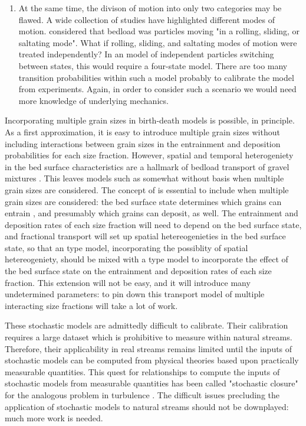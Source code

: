 \begin{enumerate}
\item At the same time, the divison of motion into only two categories may be flawed. A wide collection of studies have highlighted different modes of motion. \citet{Einstein1950} considered that bedload was particles moving "in a rolling, sliding, or saltating mode". What if rolling, sliding, and saltating modes of motion were treated independently? In an \citet{Ancey2006} model of independent particles switching between states, this would require a four-state model. There are too many transition probabilities within such a model probably to calibrate the model from experiments. Again, in order to consider such a scenario we would need more knowledge of underlying mechanics. 

\end{enumerate}

Incorporating multiple grain sizes in birth-death models is possible, in principle. 
As a first approximation, it is easy to introduce multiple grain sizes without including interactions between grain sizes in the entrainment and deposition probabilities for each size fraction. 
However, spatial and temporal heterogeniety in the bed surface characteristics are a hallmark of bedload transport of gravel mixtures \citep{Hassan2008}. 
This leaves models such as \citet{Ancey2008} somewhat without basis when multiple grain sizes are considered. 
The concept of \citet{Turowski} is essential to include when multiple grain sizes are considered: the bed surface state determines which grains can entrain \citep[e.g.][]{Wilcock2003, Parker1982}, and presumably which grains can deposit, as well. 
The entrainment and deposition rates of each size fraction will need to depend on the bed surface state, and fractional transport will set up spatial hetereogenieties in the bed surface state, so that an \citet{Ancey2014} type model, incorporating the possiblity of spatial hetereogeniety, should be mixed with a \citet{Turowski2009} type model to incorporate the effect of the bed surface state on the entrainment and deposition rates of each size fraction. 
This extension will not be easy, and it will introduce many undetermined parameters: to pin down this transport model of multiple interacting size fractions will take a lot of work. 


These stochastic models are admittedly difficult to calibrate. 
Their calibration requires a large dataset which is prohibitive to measure within natural streams. 
Therefore, their applicability in real streams remains limited until the inputs of stochastic models can be computed from physical theories based upon practically measurable quantities. 
This quest for relationships to compute the inputs of stochastic models from measurable quantities has been called "stochastic closure" for the analogous problem in turbulence \citep{Heyman2016}. 
The difficult issues precluding the application of stochastic models to natural streams should not be downplayed: much more work is needed. 



